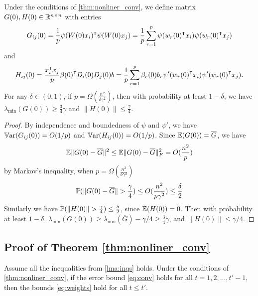 \begin{lemma}
\label{lma:GH}
Under the conditions of \cref{thm:nonliner_conv}, we define matrix $G(0),H(0)\in\mathbb{R}^{n\times n}$ with entries
\begin{equation}
\label{eq:def_G0}
G_{ij}(0) = \frac{1}{p}\psi(W(0)x_i)\transpose \psi(W(0)x_j) = \frac{1}{p}\sum_{r=1}^p\psi(w_r(0)\transpose x_i)\psi(w_r(0)\transpose x_j) 
\end{equation}
and 
\begin{equation}
\label{eq:def_H0}
H_{ij}(0) = \frac{x_i\transpose x_j}{p}\beta(0)\transpose D_i(0)D_j(0)b = \frac{1}{p}\sum_{r=1}^p\beta_r(0)b_r\psi'(w_r(0)\transpose x_i)\psi'(w_r(0)\transpose x_j).
\end{equation}
For any $\delta \in (0,1)$, if $p=\Omega(\frac{n^2}{\delta\gamma^2})$, then with probability at least $1-\delta$, we have $\lambda_{\min}(G(0))\geq \frac{3}{4}\gamma$ and $\|H(0)\|\leq \frac{\gamma}{4}$.
\end{lemma}
\begin{proof}
By independence and boundedness of $\psi$ and $\psi'$, we have $\mathbb{V}\mathrm{ar}(G_{ij}(0)) = O(1/p)$ and $\mathbb{V}\mathrm{ar}(H_{ij}(0)) = O(1/p)$. Since $\mathbb{E}(G(0))=\overline{G}$, we have
\begin{equation*}
\mathbb{E}\|G(0)-\overline{G}\|^2 \leq \mathbb{E}\|G(0)-\overline{G}\|^2_F = O(\frac{n^2}{p})
\end{equation*}
by Markov's inequality, when $p=\Omega(\frac{n^2}{\delta\gamma^2})$
\begin{equation*}
    \prob(\|G(0)-\overline{G}\|>\frac{\gamma}{4})\leq O(\frac{n^2}{p\gamma^2})\leq\frac{\delta}{2}
\end{equation*}
Similarly we have $\prob(\|H(0)\|>\frac{\gamma}{4})\leq\frac{\delta}{2}$, since $\mathbb{E}(H(0))=0$. Then with probability at least $1-\delta$, $\lambda_{\min}(G(0)) \geq \lambda_{\min}(\overline{G}) -\gamma/4 \geq \frac{3}{4}\gamma$, and $\|H(0)\|\leq \gamma/4$.
\end{proof}

\subsection{Proof of Theorem \ref{thm:nonliner_conv}}

\begin{lemma}
\label{lma:weights}
Assume all the inequalities from \cref{lma:inqs} holds. Under the conditions of \cref{thm:nonliner_conv}, if the error bound \eqref{eq:conv} holds for all $t=1,2,...,t'-1$, then the bounds \eqref{eq:weights} hold for all $t\leq t'$.
\end{lemma}


